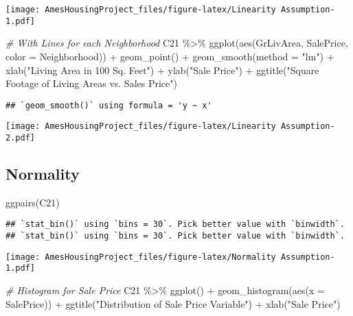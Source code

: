 \documentclass[
]{article}
\newenvironment{Shaded}{\begin{snugshade}}{\end{snugshade}}
\newcommand{\AttributeTok}[1]{\textcolor[rgb]{0.77,0.63,0.00}{#1}}
\newcommand{\CommentTok}[1]{\textcolor[rgb]{0.56,0.35,0.01}{\textit{#1}}}
\newcommand{\FunctionTok}[1]{\textcolor[rgb]{0.00,0.00,0.00}{#1}}
\newcommand{\NormalTok}[1]{#1}
\newcommand{\SpecialCharTok}[1]{\textcolor[rgb]{0.00,0.00,0.00}{#1}}
\newcommand{\StringTok}[1]{\textcolor[rgb]{0.31,0.60,0.02}{#1}}
\begin{document}
\texttt{[image: AmesHousingProject\_files/figure-latex/Linearity Assumption-1.pdf]}

\begin{Shaded}
\begin{Highlighting}[]
\CommentTok{\# With Lines for each Neighborhood}
\NormalTok{C21 }\SpecialCharTok{\%\textgreater{}\%} \FunctionTok{ggplot}\NormalTok{(}\FunctionTok{aes}\NormalTok{(GrLivArea, SalePrice, }\AttributeTok{color =}\NormalTok{ Neighborhood)) }\SpecialCharTok{+} \FunctionTok{geom\_point}\NormalTok{() }\SpecialCharTok{+}
  \FunctionTok{geom\_smooth}\NormalTok{(}\AttributeTok{method =} \StringTok{"lm"}\NormalTok{) }\SpecialCharTok{+} 
  \FunctionTok{xlab}\NormalTok{(}\StringTok{"Living Area in 100 Sq. Feet"}\NormalTok{) }\SpecialCharTok{+} \FunctionTok{ylab}\NormalTok{(}\StringTok{"Sale Price"}\NormalTok{) }\SpecialCharTok{+}
  \FunctionTok{ggtitle}\NormalTok{(}\StringTok{"Square Footage of Living Areas vs. Sales Price"}\NormalTok{)}
\end{Highlighting}
\end{Shaded}

\begin{verbatim}
## `geom_smooth()` using formula = 'y ~ x'
\end{verbatim}

\texttt{[image: AmesHousingProject\_files/figure-latex/Linearity Assumption-2.pdf]}

\hypertarget{normality}{%
\subsection{Normality}\label{normality}}

\begin{Shaded}
\begin{Highlighting}[]
\FunctionTok{ggpairs}\NormalTok{(C21)}
\end{Highlighting}
\end{Shaded}

\begin{verbatim}
## `stat_bin()` using `bins = 30`. Pick better value with `binwidth`.
## `stat_bin()` using `bins = 30`. Pick better value with `binwidth`.
\end{verbatim}

\texttt{[image: AmesHousingProject\_files/figure-latex/Normality Assumption-1.pdf]}

\begin{Shaded}
\begin{Highlighting}[]
\CommentTok{\# Histogram for Sale Price}
\NormalTok{C21 }\SpecialCharTok{\%\textgreater{}\%} \FunctionTok{ggplot}\NormalTok{() }\SpecialCharTok{+} \FunctionTok{geom\_histogram}\NormalTok{(}\FunctionTok{aes}\NormalTok{(}\AttributeTok{x =}\NormalTok{ SalePrice)) }\SpecialCharTok{+} 
  \FunctionTok{ggtitle}\NormalTok{(}\StringTok{"Distribution of Sale Price Variable"}\NormalTok{) }\SpecialCharTok{+} \FunctionTok{xlab}\NormalTok{(}\StringTok{"Sale Price"}\NormalTok{)}
\end{Highlighting}
\end{Shaded}
\end{document}
